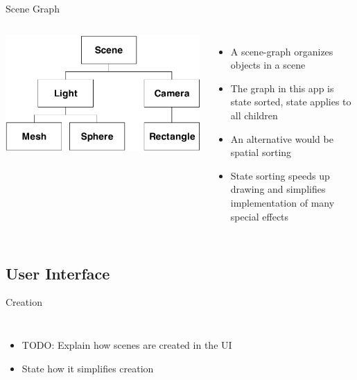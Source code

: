\documentclass[12pt,ucs,hyperref={pdftext}]{beamer}
\newlength{\columnleft}
\newlength{\columnright}
\begin{document}
\begin{frame}{Scene Graph}
\begin{columns}

\column{\columnleft}
\includegraphics[width=\columnleft]{media/scene.pdf}

\column{\columnright}
\begin{itemize}%
\item A scene-graph organizes objects in a scene
\item The graph in this app is state sorted, state applies to all children
\item An alternative would be spatial sorting
\item State sorting speeds up drawing and simplifies implementation of many special effects
\end{itemize}

\end{columns}
\end{frame}


\subsection{User Interface}

\begin{frame}{Creation}
\begin{columns}

\column{\columnleft}

\column{\columnright}
\begin{itemize}%
\item TODO: Explain how scenes are created in the UI
\item State how it simplifies creation
\end{itemize}

\end{columns}
\end{frame}
\end{document}
